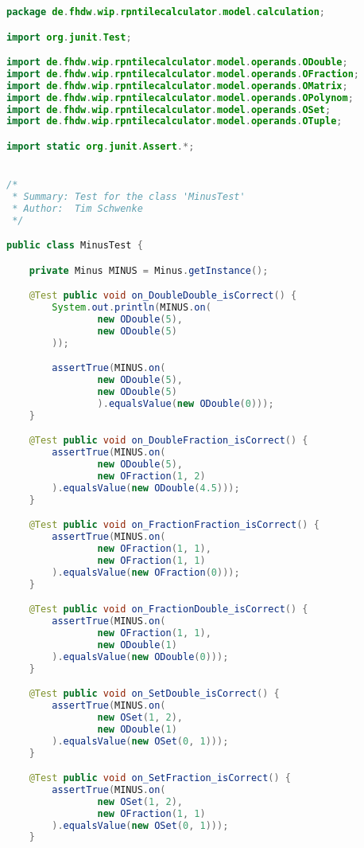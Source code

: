 \begin{lstlisting}[caption=MinusTest (Schwenke),label=list:MinusTest,language=Java]
package de.fhdw.wip.rpntilecalculator.model.calculation;

import org.junit.Test;

import de.fhdw.wip.rpntilecalculator.model.operands.ODouble;
import de.fhdw.wip.rpntilecalculator.model.operands.OFraction;
import de.fhdw.wip.rpntilecalculator.model.operands.OMatrix;
import de.fhdw.wip.rpntilecalculator.model.operands.OPolynom;
import de.fhdw.wip.rpntilecalculator.model.operands.OSet;
import de.fhdw.wip.rpntilecalculator.model.operands.OTuple;

import static org.junit.Assert.*;


/*
 * Summary: Test for the class 'MinusTest'
 * Author:  Tim Schwenke
 */

public class MinusTest {

    private Minus MINUS = Minus.getInstance();

    @Test public void on_DoubleDouble_isCorrect() {
        System.out.println(MINUS.on(
                new ODouble(5),
                new ODouble(5)
        ));

        assertTrue(MINUS.on(
                new ODouble(5),
                new ODouble(5)
                ).equalsValue(new ODouble(0)));
    }

    @Test public void on_DoubleFraction_isCorrect() {
        assertTrue(MINUS.on(
                new ODouble(5),
                new OFraction(1, 2)
        ).equalsValue(new ODouble(4.5)));
    }

    @Test public void on_FractionFraction_isCorrect() {
        assertTrue(MINUS.on(
                new OFraction(1, 1),
                new OFraction(1, 1)
        ).equalsValue(new OFraction(0)));
    }

    @Test public void on_FractionDouble_isCorrect() {
        assertTrue(MINUS.on(
                new OFraction(1, 1),
                new ODouble(1)
        ).equalsValue(new ODouble(0)));
    }

    @Test public void on_SetDouble_isCorrect() {
        assertTrue(MINUS.on(
                new OSet(1, 2),
                new ODouble(1)
        ).equalsValue(new OSet(0, 1)));
    }

    @Test public void on_SetFraction_isCorrect() {
        assertTrue(MINUS.on(
                new OSet(1, 2),
                new OFraction(1, 1)
        ).equalsValue(new OSet(0, 1)));
    }


\end{lstlisting}

